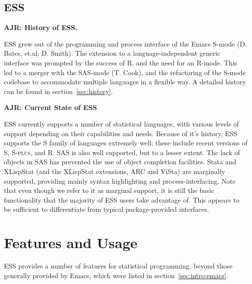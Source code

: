 \documentclass{article}
\newcommand*{\Splus}{\textsc{S-plus}}
\begin{document}
\subsection{ESS}
\label{sec:intro:ESS}

\textbf{AJR: History of ESS.}

ESS grew out of the programming and process interface of the Emacs
S-mode (D. Bates, et.al; D. Smith).  The extension to a
language-independent generic interface was prompted by the success of
R, and the need for an R-mode.  This led to a merger with the SAS-mode
(T. Cook), and the refactoring of the S-mode codebase to accommodate
multiple languages in a flexible way.  A detailed  history can be
found in section~\ref{sec:history}.

\textbf{AJR: Current State of ESS}

ESS currently supports a number of statistical languages, with various
levels of support depending on their capabilities and needs.  Because
of it's history, ESS supports the S family of languages extremely
well; these include recent versions of S, \Splus, and R.  SAS is also
well supported, but to a lesser extent.  The lack of objects in SAS
has prevented the use of object completion facilities.  Stata and
XLispStat (and the XLispStat extensions, ARC and ViSta) are marginally
supported, providing mainly syntax highlighting and
process-interfacing.  Note that even though we refer to it as marginal
support, it is still the basic functionality that the majority of ESS
users take advantage of.  This appears to be sufficient to
differentiate from typical package-provided interfaces.

\section{Features and Usage}
\label{sec:basic}

ESS provides a number of features for statistical programming, beyond
those generally provided by Emacs, which were listed in
section~\ref{sec:intro:emacs}.
\end{document}
